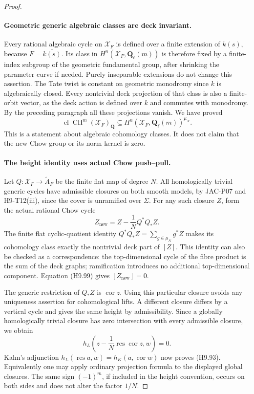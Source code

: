 \begin{proof}
\paragraph{Geometric generic algebraic classes are deck invariant.}
Every rational algebraic cycle on $\mathcal X_F$ is defined over
a finite extension of $k(s)$, because $F=\overline{k(s)}$.
Its class in $H^n(\mathcal X_F,\mathbf Q_\ell(m))$ is therefore
fixed by a finite-index subgroup of the geometric fundamental
group, after shrinking the parameter curve if needed. Purely
inseparable extensions do not change this assertion. The Tate
twist is constant on geometric monodromy since $k$ is
algebraically closed. Every nontrivial deck projection of that
class is also a finite-orbit vector, as the deck action is
defined over $k$ and commutes with monodromy. By the preceding
paragraph all these projections vanish. We have proved
\[
 \operatorname{cl}\operatorname{CH}^m(\mathcal X_F)_{\mathbf Q}
      \subseteq H^n(\mathcal X_F,\mathbf Q_\ell(m))^{\mu_N}.
                                                               \tag{H9.99}
\]
This is a statement about algebraic cohomology classes. It
does not claim that the new Chow group or its norm kernel is
zero.

\paragraph{The height identity uses actual Chow push--pull.}
Let $Q:\mathcal X_F\to\widetilde A_F$ be the finite flat map
of degree $N$. All homologically trivial generic cycles have
admissible closures on both smooth models, by JAC-P07 and
H9-T12(iii), since the cover is unramified over $\Sigma$.
For any such closure $Z$, form the actual rational Chow cycle
\[
       Z_{\mathrm{new}}=Z-\frac1N Q^*Q_*Z.
\]
The finite flat cyclic-quotient identity
$Q^*Q_*Z=\sum_{g\in\mu_N}g^*Z$ makes its cohomology class
exactly the nontrivial deck part of $[Z]$. This identity can
also be checked as a correspondence: the top-dimensional
cycle of the fibre product is the sum of the deck graphs;
ramification introduces no additional top-dimensional
component. Equation (H9.99) gives $[Z_{\mathrm{new}}]=0$.

The generic restriction of $Q_*Z$ is $\operatorname{cor}z$.
Using this particular closure avoids any uniqueness assertion
for cohomological lifts. A different closure differs by a
vertical cycle and gives the same height by admissibility.
Since a globally homologically trivial closure has zero
intersection with every admissible closure, we obtain
\[
 h_L\left(z-\frac1N\operatorname{res}\operatorname{cor}z,w\right)=0.
\]
Kahn's adjunction
$h_L(\operatorname{res}a,w)=h_K(a,\operatorname{cor}w)$ now
proves (H9.93). Equivalently one may apply ordinary projection
formula to the displayed global closures. The same sign
$(-1)^m$, if included in the height convention, occurs on both
sides and does not alter the factor $1/N$.


\end{proof}
